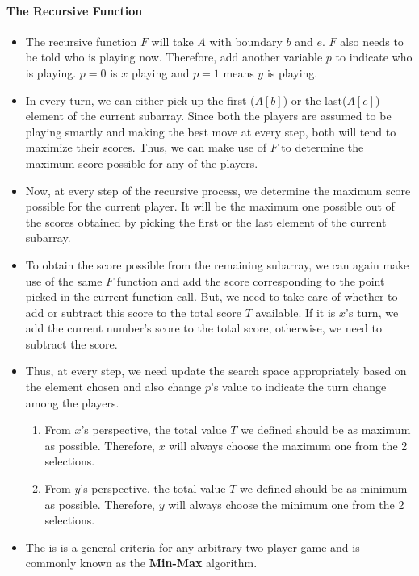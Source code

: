 \paragraph{The Recursive Function}
\begin{itemize}
\item The recursive function $F$ will take $A$ with boundary $b$ and $e$. $F$ also needs to be told who is playing now. Therefore, add another variable $p$ to indicate who is playing. $p=0$ is $x$ playing and $p=1$ means $y$ is playing. 

\item In every turn, we can either pick up the first ($A[b]$) or the last($A[e]$) element of the current subarray. Since both the players are assumed to be playing smartly and making the best move at every step, both will tend to maximize their scores. Thus, we can make use of $F$ to determine the maximum score possible for any of the players.

\item Now, at every step of the recursive process, we determine the maximum score possible for the current player. It will be the maximum one possible out of the scores obtained by picking the first or the last element of the current subarray.

\item To obtain the score possible from the remaining subarray, we can again make use of the same $F$ function and add the score corresponding to the point picked in the current function call. But, we need to take care of whether to add or subtract this score to the total score $T$ available. If it is $x$'s turn, we add the current number's score to the total score, otherwise, we need to subtract the score.

\item Thus, at every step, we need update the search space appropriately based on the element chosen and also change $p$'s value to indicate the turn change among the players. 

\begin{enumerate}
\item From $x$'s perspective, the total value $T$ we defined should be as maximum as possible. Therefore, $x$ will always choose the maximum one from the 2 selections.
\item From $y$'s perspective, the total value $T$ we defined should be as minimum as possible. Therefore, $y$ will always choose the minimum one from the 2 selections.
\end{enumerate}

\item The is is a general criteria for any arbitrary two player game and is commonly known as the \textbf{Min-Max} algorithm.
\end{itemize}


